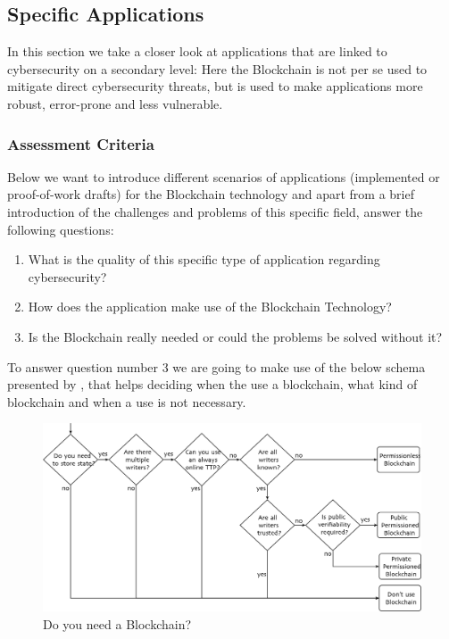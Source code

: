 \subsection{Specific Applications}
\label{subsec:03_applications}

In this section we take a closer look at applications that are linked to cybersecurity on a secondary level: Here the Blockchain is not per se used to mitigate direct cybersecurity threats, but is used to make applications more robust, error-prone and less vulnerable. 

\subsubsection{Assessment Criteria}
Below we want to introduce different scenarios of applications (implemented or proof-of-work drafts) for the Blockchain technology and apart from a brief introduction of the challenges and problems of this specific field, answer the following questions:
\begin{enumerate}
	\item What is the quality of this specific type of application regarding cybersecurity? 
	\item How does the application make use of the Blockchain Technology?
	\item Is the Blockchain really needed or could the problems be solved without it? 
\end{enumerate}
To answer question number 3 we are going to make use of the below schema presented by \citeauthor{Wust2017}, that helps deciding when the use a blockchain, what kind of blockchain and when a use is not necessary.
\begin{figure}[ht!]
  \begin{center}
  \includegraphics[scale=0.6]{Talk7/img/app/BCorNot}
 	\end{center}
  \caption{Do you need a Blockchain?}
 	\label{blockchain_or_not}
\end{figure}

